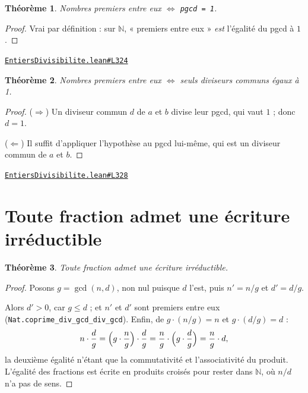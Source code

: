 \documentclass[11pt,a4paper]{article}
\theoremstyle{definition}
\theoremstyle{plain}
\newtheorem{theoreme}{Théorème}
\newcommand{\source}[2]{\par\smallskip\noindent\hfill{\footnotesize\href{#1}{\texttt{#2}}}\par\smallskip}
\begin{document}
\begin{theoreme}
Nombres premiers entre eux \(\iff\) \texttt{pgcd = 1}.
\end{theoreme}

\begin{proof}
Vrai par définition : sur $\mathbb{N}$, « premiers entre eux » \emph{est} l'égalité du
pgcd à $1$.
\end{proof}

\source{https://github.com/Commutator-IO/learn-lean/blob/main/cours/01-college/01-nombres-et-calculs/EntiersDivisibilite.lean\#L324}{EntiersDivisibilite.lean\#L324}

\begin{theoreme}
Nombres premiers entre eux \(\iff\) seuls diviseurs communs égaux à 1.
\end{theoreme}

\begin{proof}
($\Rightarrow$) Un diviseur commun $d$ de $a$ et $b$ divise leur pgcd, qui vaut $1$ ;
donc $d = 1$.

($\Leftarrow$) Il suffit d'appliquer l'hypothèse au pgcd lui-même, qui est un diviseur
commun de $a$ et $b$.
\end{proof}

\source{https://github.com/Commutator-IO/learn-lean/blob/main/cours/01-college/01-nombres-et-calculs/EntiersDivisibilite.lean\#L328}{EntiersDivisibilite.lean\#L328}

\section{Toute fraction admet une écriture irréductible}

\begin{theoreme}
Toute fraction admet une écriture irréductible.
\end{theoreme}

\begin{proof}
Posons $g = \gcd(n,d)$, non nul puisque $d$ l'est, puis $n' = n/g$ et $d' = d/g$.

Alors $d' > 0$, car $g \le d$ ; et $n'$ et $d'$ sont premiers entre eux
(\texttt{Nat.coprime\_div\_gcd\_div\_gcd}). Enfin, de $g \cdot (n/g) = n$ et
$g \cdot (d/g) = d$ :
\[
n \cdot \frac{d}{g}
 = \Bigl(g \cdot \frac{n}{g}\Bigr) \cdot \frac{d}{g}
 = \frac{n}{g} \cdot \Bigl(g \cdot \frac{d}{g}\Bigr)
 = \frac{n}{g} \cdot d ,
\]
la deuxième égalité n'étant que la commutativité et l'associativité du produit. L'égalité
des fractions est écrite en produits croisés pour rester dans $\mathbb{N}$, où $n/d$ n'a
pas de sens.
\end{proof}
\end{document}

